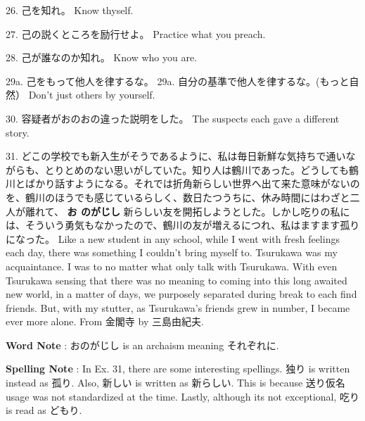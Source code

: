 \par{26. 己を知れ。 \hfill\break
Know thyself. }

\par{27. 己の説くところを励行せよ。 \hfill\break
Practice what you preach. }

\par{28. 己が誰なのか知れ。 \hfill\break
Know who you are. }

\par{29a. 己をもって他人を律するな。 \hfill\break
29a. 自分の基準で他人を律するな。(もっと自然） \hfill\break
Don't just others by yourself. }

\par{30. 容疑者がおのおの違った説明をした。 \hfill\break
The suspects each gave a different story. }

\par{31. どこの学校でも新入生がそうであるように、私は毎日新鮮な気持ちで通いながらも、とりとめのない思いがしていた。知り人は鶴川であった。どうしても鶴川とばかり話すようになる。それでは折角新らしい世界へ出て来た意味がないのを、鶴川のほうでも感じているらしく、数日たつうちに、休み時間にはわざと二人が離れて、 \textbf{お のがじし }新らしい友を開拓しようとした。しかし吃りの私には、そういう勇気もなかったので、鶴川の友が増えるにつれ、私はますます孤りになった。 \hfill\break
Like a new student in any school, while I went with fresh feelings each day, there was something I couldn't bring myself to. Tsurukawa was my acquaintance. I was to no matter what only talk with Tsurukawa. With even Tsurukawa sensing that there was no meaning to coming into this long awaited new world, in a matter of days, we purposely separated during break to each find friends. But, with my stutter, as Tsurukawa's friends grew in number, I became ever more alone. \hfill\break
From 金閣寺 by 三島由紀夫. }

\par{\textbf{Word Note }: おのがじし is an archaism meaning それぞれに. }

\par{\textbf{Spelling Note }: In Ex. 31, there are some interesting spellings. 独り is written instead as 孤り. Also, 新しい is written as 新らしい. This is because 送り仮名 usage was not standardized at the time. Lastly, although its not exceptional, 吃り is read as どもり.  }
    